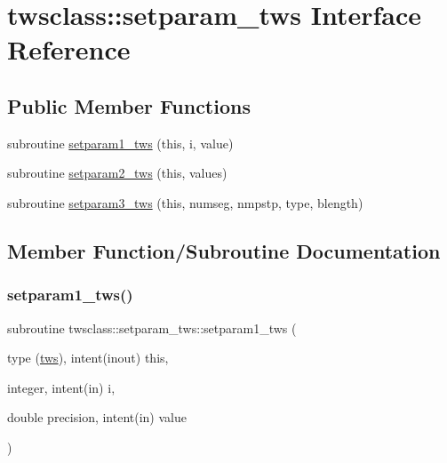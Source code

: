 \hypertarget{interfacetwsclass_1_1setparam__tws}{}\section{twsclass\+::setparam\+\_\+tws Interface Reference}
\label{interfacetwsclass_1_1setparam__tws}
\subsection*{Public Member Functions}
\begin{DoxyCompactItemize}
\item 
subroutine \mbox{\hyperlink{interfacetwsclass_1_1setparam__tws_a2286e849cb519aaff8c58ccaad29b9f1}{setparam1\+\_\+tws}} (this, i, value)
\item 
subroutine \mbox{\hyperlink{interfacetwsclass_1_1setparam__tws_a00770665c096c8fe63394971beff2fa7}{setparam2\+\_\+tws}} (this, values)
\item 
subroutine \mbox{\hyperlink{interfacetwsclass_1_1setparam__tws_a89bd0a73883aa06198491ae13df4ecce}{setparam3\+\_\+tws}} (this, numseg, nmpstp, type, blength)
\end{DoxyCompactItemize}


\subsection{Member Function/\+Subroutine Documentation}
\mbox{\label{interfacetwsclass_1_1setparam__tws_a2286e849cb519aaff8c58ccaad29b9f1}} 
\subsubsection{\texorpdfstring{setparam1\_tws()}{setparam1\_tws()}}
{\footnotesize\ttfamily subroutine twsclass\+::setparam\+\_\+tws\+::setparam1\+\_\+tws (\begin{DoxyParamCaption}\item[{type (\mbox{\hyperlink{namespacetwsclass_structtwsclass_1_1tws}{tws}}), intent(inout)}]{this,  }\item[{integer, intent(in)}]{i,  }\item[{double precision, intent(in)}]{value }\end{DoxyParamCaption})}

